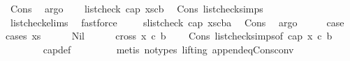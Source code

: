 \begin{isabellebody}
\ Cons\ \isamarkupfalse%
\ argo\isanewline
\ \ \isamarkupfalse%
\ {\isachardoublequoteopen}list{\isacharunderscore}{\kern0pt}check\ cap{}\ {\isacharparenleft}{\kern0pt}xs{\isacharat}{\kern0pt}{\isacharbrackleft}{\kern0pt}c{\isacharcomma}{\kern0pt}b{\isacharbrackright}{\kern0pt}{\isacharparenright}{\kern0pt}{\isachardoublequoteclose}\ \isamarkupfalse%
\ Cons{\isacharparenleft}{\kern0pt}{}{\isacharparenright}{\kern0pt}\ list{\isacharunderscore}{\kern0pt}check{\isachardot}{\kern0pt}simps\ \isanewline
\ \ \ \ \isamarkupfalse%
\ list{\isacharunderscore}{\kern0pt}check{\isachardot}{\kern0pt}elims{\isacharparenleft}{\kern0pt}{}{\isacharparenright}{\kern0pt}\ \isamarkupfalse%
\ fastforce\ \isanewline
\ \ \isamarkupfalse%
\ s{}{\isacharcolon}{\kern0pt}{\isachardoublequoteopen}list{\isacharunderscore}{\kern0pt}check\ cap{}\ {\isacharparenleft}{\kern0pt}xs{\isacharat}{\kern0pt}{\isacharbrackleft}{\kern0pt}c{\isacharcomma}{\kern0pt}b{\isacharcomma}{\kern0pt}a{\isacharbrackright}{\kern0pt}{\isacharparenright}{\kern0pt}{\isachardoublequoteclose}\ \isamarkupfalse%
\ Cons\ \isamarkupfalse%
\ argo\isanewline
\ \ \isamarkupfalse%
\ \isamarkupfalse%
\ {\isacharquery}{\kern0pt}case\isanewline
\ \ \isamarkupfalse%
{\isacharparenleft}{\kern0pt}cases\ xs{\isacharparenright}{\kern0pt}\isanewline
\ \ \ \ \isamarkupfalse%
\ Nil\isanewline
\ \ \ \ \isamarkupfalse%
\ {\isachardoublequoteopen}cross{}\ x\ c\ b\ {\isacharless}{\kern0pt}\ {}{\isachardoublequoteclose}\ \isamarkupfalse%
\ Cons{\isacharparenleft}{\kern0pt}{}{\isacharparenright}{\kern0pt}\ list{\isacharunderscore}{\kern0pt}check{\isachardot}{\kern0pt}simps{\isacharparenleft}{\kern0pt}{}{\isacharparenright}{\kern0pt}{\isacharbrackleft}{\kern0pt}of\ cap{}\ x\ c\ b\ {\isachardoublequoteopen}{\isacharbrackleft}{\kern0pt}{\isacharbrackright}{\kern0pt}{\isachardoublequoteclose}{\isacharbrackright}{\kern0pt}\isanewline
\ \ \ \ \ \ \isamarkupfalse%
\ cap{}{\isacharunderscore}{\kern0pt}def\ \isanewline
\ \ \ \ \ \ \isamarkupfalse%
\ {\isacharparenleft}{\kern0pt}metis\ {\isacharparenleft}{\kern0pt}no{\isacharunderscore}{\kern0pt}types{\isacharcomma}{\kern0pt}\ lifting{\isacharparenright}{\kern0pt}\ append{\isacharunderscore}{\kern0pt}eq{\isacharunderscore}{\kern0pt}Cons{\isacharunderscore}{\kern0pt}conv{\isacharparenright}{\kern0pt}\ \isanewline

\end{isabellebody}
